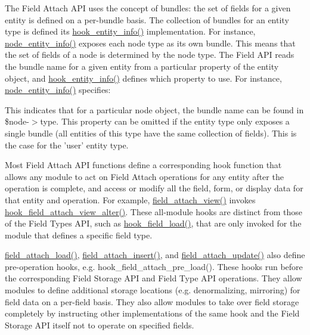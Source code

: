 The Field Attach API uses the concept of bundles: the set of fields for a given entity is defined on a per-\/bundle basis. The collection of bundles for an entity type is defined its \hyperlink{group__hooks_gaf02318e9d0e8cdbf6d187b271b9969a8}{hook\_\-entity\_\-info()} implementation. For instance, \hyperlink{node_8module_aaf9f722394e2a25a4bd17e53d9923bfa}{node\_\-entity\_\-info()} exposes each node type as its own bundle. This means that the set of fields of a node is determined by the node type. The Field API reads the bundle name for a given entity from a particular property of the entity object, and \hyperlink{group__hooks_gaf02318e9d0e8cdbf6d187b271b9969a8}{hook\_\-entity\_\-info()} defines which property to use. For instance, \hyperlink{node_8module_aaf9f722394e2a25a4bd17e53d9923bfa}{node\_\-entity\_\-info()} specifies: 
 This indicates that for a particular node object, the bundle name can be found in \$node-\/$>$type. This property can be omitted if the entity type only exposes a single bundle (all entities of this type have the same collection of fields). This is the case for the 'user' entity type.

Most Field Attach API functions define a corresponding hook function that allows any module to act on Field Attach operations for any entity after the operation is complete, and access or modify all the field, form, or display data for that entity and operation. For example, \hyperlink{group__field__attach_gaa752a8fd31173fd2308d71eb059e00c7}{field\_\-attach\_\-view()} invokes \hyperlink{group__field__attach_ga0c415aacfd70903f556fb67517dfe1ee}{hook\_\-field\_\-attach\_\-view\_\-alter()}. These all-\/module hooks are distinct from those of the Field Types API, such as \hyperlink{group__field__types_ga37f2456e9b5b8b39dc11cffd59163c19}{hook\_\-field\_\-load()}, that are only invoked for the module that defines a specific field type.

\hyperlink{group__field__attach_ga1e92543395961c912eb293b50e991586}{field\_\-attach\_\-load()}, \hyperlink{group__field__attach_gad7c37d577b97db5e0c182bc570ed7cf4}{field\_\-attach\_\-insert()}, and \hyperlink{group__field__attach_ga8d15efdca36306ea04552bed4986e77b}{field\_\-attach\_\-update()} also define pre-\/operation hooks, e.g. hook\_\-field\_\-attach\_\-pre\_\-load(). These hooks run before the corresponding Field Storage API and Field Type API operations. They allow modules to define additional storage locations (e.g. denormalizing, mirroring) for field data on a per-\/field basis. They also allow modules to take over field storage completely by instructing other implementations of the same hook and the Field Storage API itself not to operate on specified fields.

